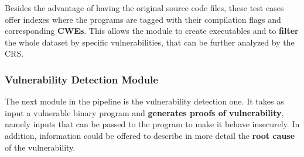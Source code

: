 \documentclass[12pt,a4paper,english,onecolumn]{IEEEtran}
\begin{document}
Besides the advantage of having the original source code files, these test cases offer indexes where the programs are tagged with their compilation flags and corresponding \textbf{CWEs}. This allows the module to create executables and to \textbf{filter} the whole dataset by specific vulnerabilities, that can be further analyzed by the CRS.

\subsubsection{Vulnerability Detection Module}

The next module in the pipeline is the vulnerability detection one. It takes as input a vulnerable binary program and \textbf{generates proofs of vulnerability}, namely inputs that can be passed to the program to make it behave insecurely. In addition, information could be offered to describe in more detail the \textbf{root cause} of the vulnerability.
\end{document}
